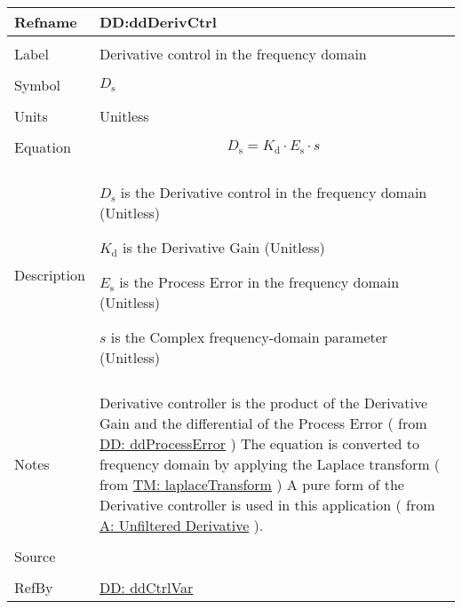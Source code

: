 \documentclass[12pt]{article}
\begin{document}
\vspace{\baselineskip}
\noindent
\begin{minipage}{\textwidth}
\begin{tabular}{>{\raggedright}p{}>{\raggedright\arraybackslash}p{}}
\toprule \textbf{Refname} & \textbf{DD:ddDerivCtrl}
\label{DD:ddDerivCtrl}
\\ \midrule \\
Label & Derivative control in the frequency domain
        
\\ \midrule \\
Symbol & ${D_{\text{s}}}$
         
\\ \midrule \\
Units & Unitless
        
\\ \midrule \\
Equation & \begin{displaymath}
           {D_{\text{s}}}={K_{\text{d}}}\cdot{}{E_{\text{s}}}\cdot{}s
           \end{displaymath}
\\ \midrule \\
Description & \begin{symbDescription}
              \item{${D_{\text{s}}}$ is the Derivative control in the frequency domain (Unitless)}
              \item{${K_{\text{d}}}$ is the Derivative Gain (Unitless)}
              \item{${E_{\text{s}}}$ is the Process Error in the frequency domain (Unitless)}
              \item{$s$ is the Complex frequency-domain parameter (Unitless)}
              \end{symbDescription}
\\ \midrule \\
Notes & Derivative controller is the product of the Derivative Gain and the differential of the Process Error ( from  \hyperref[DD:ddProcessError]{DD: ddProcessError} ) The equation is converted to frequency domain by applying the Laplace transform ( from \hyperref[TM:laplaceTransform]{TM: laplaceTransform} ) A pure form of the Derivative controller is used in this application ( from \hyperref[unfilteredDerivative]{A: Unfiltered Derivative} ).
        
\\ \midrule \\
Source & \cite{johnson2008}
         
\\ \midrule \\
RefBy & \hyperref[DD:ddCtrlVar]{DD: ddCtrlVar}
        
\\ \bottomrule
\end{tabular}
\end{minipage}
\end{document}
